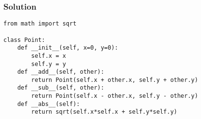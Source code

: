 \documentclass[14pt,compress,aspectratio=169]{beamer}
\begin{document}
\begin{frame}
  \frametitle{Solution}
  \small
\begin{lstlisting}
from math import sqrt

class Point:
    def __init__(self, x=0, y=0):
        self.x = x
        self.y = y
    def __add__(self, other):
        return Point(self.x + other.x, self.y + other.y)
    def __sub__(self, other):
        return Point(self.x - other.x, self.y - other.y)
    def __abs__(self):
        return sqrt(self.x*self.x + self.y*self.y)

\end{lstlisting}
\end{frame}
\end{document}
